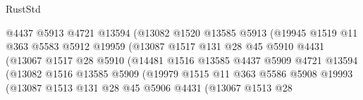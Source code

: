 \begin{lexlean}{RustStd}
\begin{coremodule}
                                  @4437
                                  @5913
                                  @4721
                                  @13594
                                  (@13082
                                    @1520
                                    @13585
                                    @5913
                                    (@19945
                                      @1519
                                      @11
                                      @363
                                      @5583
                                      @5912
                                      @19959
                                      (@13087
                                        @1517
                                        @131
                                        @28
                                        @45
                                        @5910
                                        @4431
                                        (@13067
                                          @1517
                                          @28
                                          @5910
                                          (@14481
                                            @1516
                                            @13585
                                            @4437
                                            @5909
                                            @4721
                                            @13594
                                            (@13082
                                              @1516
                                              @13585
                                              @5909
                                              (@19979
                                                @1515
                                                @11
                                                @363
                                                @5586
                                                @5908
                                                @19993
                                                (@13087
                                                  @1513
                                                  @131
                                                  @28
                                                  @45
                                                  @5906
                                                  @4431
                                                  (@13067
                                                    @1513
                                                    @28

\end{coremodule}
\end{lexlean}
